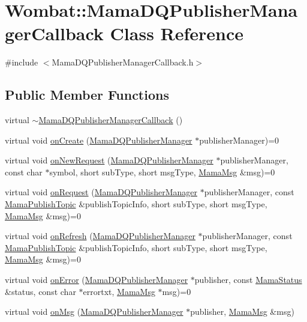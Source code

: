 \hypertarget{classWombat_1_1MamaDQPublisherManagerCallback}{
\section{Wombat::MamaDQPublisherManagerCallback Class Reference}
\label{classWombat_1_1MamaDQPublisherManagerCallback}
}


{\ttfamily \#include $<$MamaDQPublisherManagerCallback.h$>$}\subsection*{Public Member Functions}
\begin{DoxyCompactItemize}
\item 
virtual \hyperlink{classWombat_1_1MamaDQPublisherManagerCallback_a5750d37ba7aef889c78df47a7e91879b}{$\sim$MamaDQPublisherManagerCallback} ()
\item 
virtual void \hyperlink{classWombat_1_1MamaDQPublisherManagerCallback_a8ec11e1f59dc2754c0eef1d62d254136}{onCreate} (\hyperlink{classWombat_1_1MamaDQPublisherManager}{MamaDQPublisherManager} $\ast$publisherManager)=0
\item 
virtual void \hyperlink{classWombat_1_1MamaDQPublisherManagerCallback_a9eeeebfe0c18db07e39bd994796e0148}{onNewRequest} (\hyperlink{classWombat_1_1MamaDQPublisherManager}{MamaDQPublisherManager} $\ast$publisherManager, const char $\ast$symbol, short subType, short msgType, \hyperlink{classWombat_1_1MamaMsg}{MamaMsg} \&msg)=0
\item 
virtual void \hyperlink{classWombat_1_1MamaDQPublisherManagerCallback_a965ba3cb09c848ec2e9b389758ede731}{onRequest} (\hyperlink{classWombat_1_1MamaDQPublisherManager}{MamaDQPublisherManager} $\ast$publisherManager, const \hyperlink{classWombat_1_1MamaPublishTopic}{MamaPublishTopic} \&publishTopicInfo, short subType, short msgType, \hyperlink{classWombat_1_1MamaMsg}{MamaMsg} \&msg)=0
\item 
virtual void \hyperlink{classWombat_1_1MamaDQPublisherManagerCallback_a4083f41af3fcab7842b12ea6aeb817c6}{onRefresh} (\hyperlink{classWombat_1_1MamaDQPublisherManager}{MamaDQPublisherManager} $\ast$publisherManager, const \hyperlink{classWombat_1_1MamaPublishTopic}{MamaPublishTopic} \&publishTopicInfo, short subType, short msgType, \hyperlink{classWombat_1_1MamaMsg}{MamaMsg} \&msg)=0
\item 
virtual void \hyperlink{classWombat_1_1MamaDQPublisherManagerCallback_aa3df0616a84eb7cf0f5dff24946beb14}{onError} (\hyperlink{classWombat_1_1MamaDQPublisherManager}{MamaDQPublisherManager} $\ast$publisher, const \hyperlink{classWombat_1_1MamaStatus}{MamaStatus} \&status, const char $\ast$errortxt, \hyperlink{classWombat_1_1MamaMsg}{MamaMsg} $\ast$msg)=0
\item 
virtual void \hyperlink{classWombat_1_1MamaDQPublisherManagerCallback_a66c9b8bdfac8ca21fa46f64f928d7da8}{onMsg} (\hyperlink{classWombat_1_1MamaDQPublisherManager}{MamaDQPublisherManager} $\ast$publisher, \hyperlink{classWombat_1_1MamaMsg}{MamaMsg} \&msg)
\end{DoxyCompactItemize}


